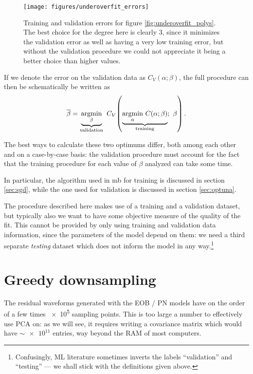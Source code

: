 \documentclass[main.tex]{subfiles}
\begin{document}
\begin{figure}[ht]
\centering
\texttt{[image: figures/underoverfit\_errors]}
\caption{Training and validation errors for figure \ref{fig:underoverfit_polys}. The best choice for the degree here is clearly \(3\), since it minimizes the validation error as well as having a very low training error, but without the validation procedure we could not appreciate it being a better choice than higher values.}
\label{fig:underoverfit_errors}
\end{figure}

If we denote the error on the validation data as \(C_V(\alpha ; \beta )\), the full procedure can then be schematically be written as 
%
\begin{align}
\overline{\beta} = \underbrace{\underset{\beta }{\operatorname{argmin}}}_{\text{validation} } \  C_V \qty(
    \underbrace{\underset{\alpha }{\operatorname{argmin}} \  C(\alpha ; \beta )}_{\text{training}} ; \ \beta )
\,.
\end{align}

The best ways to calculate these two optimums differ, both among each other and on a case-by-case basis: the validation procedure must account for the fact that the training procedure for each value of \(\beta \) analyzed can take some time. 

In particular, the algorithm used in \ac{mb} for training is discussed in section \ref{sec:sgd}, while the one used for validation is discussed in section \ref{sec:optuna}. 

The procedure described here makes use of a training and a validation dataset, but typically also we want to have some objective measure of the quality of the fit.
This cannot be provided by only using training and validation data information, since the parameters of the model depend on them: we need a third separate \emph{testing} dataset which does not inform the model in any way.\footnote{Confusingly,  \ac{ML} literature sometimes inverts the labels ``validation'' and ``testing'' --- we shall stick with the definitions given above.}


\section{Greedy downsampling} \label{sec:downsampling}

The residual waveforms generated with the \ac{EOB} / \ac{PN} models have on the order of a few times \num{e5} sampling points. 
This is too large a number to effectively use \ac{PCA} on: as we will see, it requires writing a covariance matrix which would have \(\sim \num{e11}\) entries, way beyond the RAM of most computers. 
\end{document}

